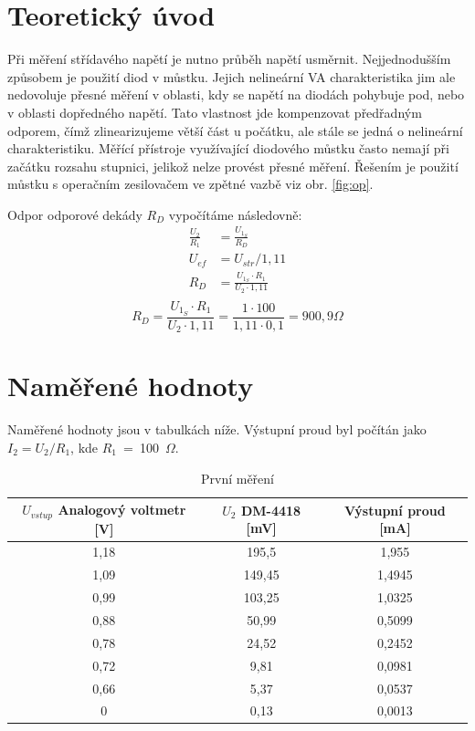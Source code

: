 \documentclass[a4paper,12pt]{article}   %
\newcommand{\tohm}{$\Omega$}
\begin{document}
\section{Teoretický úvod}
Při měření střídavého napětí je nutno průběh napětí usměrnit. Nejjednodušším způsobem je použití diod v můstku. Jejich nelineární VA charakteristika jim ale nedovoluje přesné měření v oblasti, kdy se napětí na diodách pohybuje pod, nebo v oblasti dopředného napětí. Tato vlastnost jde kompenzovat předřadným odporem, čímž zlinearizujeme větší část u počátku, ale stále se jedná o nelineární charakteristiku. Měřící přístroje využívající diodového můstku často nemají při začátku rozsahu stupnici, jelikož nelze provést přesné měření. Řešením je použití můstku s operačním zesilovačem ve zpětné vazbě viz obr. \ref{fig:op}.

Odpor odporové dekády $R_D$ vypočítáme následovně: 
\begin{equation*}
    \begin{split}
        \frac{U_2}{R_1} &= \frac{U_{1_S}}{R_D} \\
        U_{ef} &= U_{str}/1,11\\
        R_D &= \frac{U_{1_S}\cdot R_1}{U_2\cdot 1,11}\\
    \end{split}
\end{equation*}
\begin{equation*}
    R_D= \frac{U_{1_S}\cdot R_1}{U_2\cdot 1,11} = \frac{1\cdot 100}{1,11\cdot 0,1} = 900,9 \Omega
\end{equation*}


\section{Naměřené hodnoty}
Naměřené hodnoty jsou v tabulkách níže. Výstupní proud byl počítán jako $I_2=U_2/R_1$, kde $R_1$~=~100~\tohm.

\begin{table}
    \centering
    \begin{tabular}{|c|c|c|}
        $U_{vstup}$ Analogový voltmetr [V] &$U_{2}$ DM-4418 [mV] &Výstupní proud [mA] \\\hline\hline
        1,18    &195,5  &1,955  \\\hline
        1,09    &149,45 &1,4945 \\\hline
        0,99    &103,25 &1,0325 \\\hline
        0,88    &50,99  &0,5099 \\\hline
        0,78    &24,52  &0,2452 \\\hline
        0,72    &9,81   &0,0981 \\\hline
        0,66    &5,37   &0,0537 \\\hline
        0       &0,13   &0,0013 \\\hline
    \end{tabular}
    \caption{První měření}
\end{table}
\end{document}
